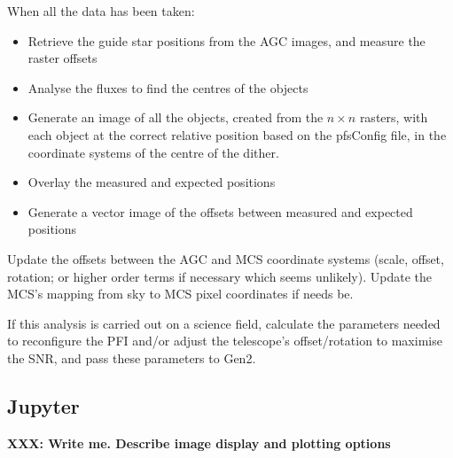 \documentclass[12pt]{article}
\newcommand{\AGC}{\gls{AGC}\xspace}
\newcommand{\MCS}{\gls{MCS}\xspace}
\newcommand{\PFI}{\gls{PFI}\xspace}
\newcommand{\XXX}[1]{\textbf{XXX: #1}}
\begin{document}
When all the data has been taken:
\begin{itemize}
\item Retrieve the guide star positions from the \AGC images, and measure the raster offsets
\item Analyse the fluxes to find the centres of the objects
\item Generate an image of all the objects, created from the $n\times n$ rasters, with each object
  at the correct relative position based on the \gls{pfsConfig} file, in the coordinate systems
  of the centre of the dither.
\item Overlay the measured and expected positions
\item Generate a vector image of the offsets between measured and expected positions
\end{itemize}

Update the offsets between the \AGC and \MCS coordinate systems (scale, offset, rotation; or higher
order terms if necessary which seems unlikely). Update the \MCS's mapping from sky to MCS pixel
coordinates if needs be.

If this analysis is carried out on a science field, calculate the parameters needed to reconfigure
the \PFI and/or adjust the telescope's offset/rotation to maximise the \gls{SNR}, and pass these
parameters to \gls{Gen2}.


\begin{appendices}

\section{Jupyter}
\label{sec:jupyter}

\XXX{Write me.  Describe image display and plotting options}

\end{appendices}

%
%
\printglossary[type=\acronymtype]
\printglossary
\end{document}

